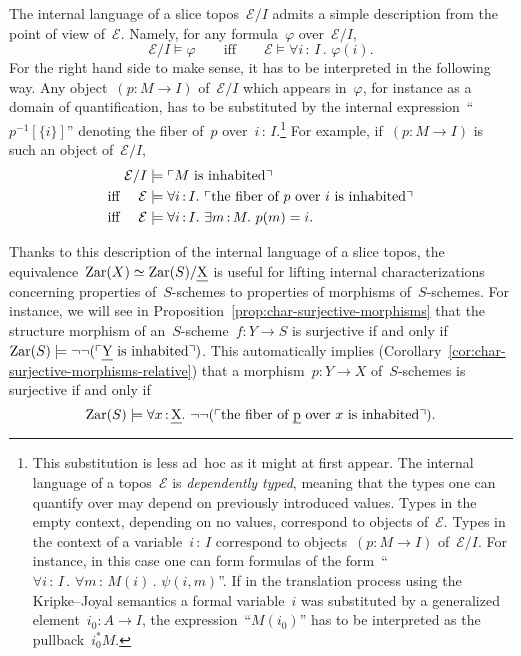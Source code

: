 \documentclass[10pt,reqno,a4paper]{amsbook}
\theoremstyle{definition}
\theoremstyle{plain}
\theoremstyle{remark}
\newcommand{\E}{\mathcal{E}}
\let\oldul\ul
\renewcommand{\ul}[1]{\text{\oldul{$#1$}}}
\newcommand{\Zar}{\mathrm{Zar}}
\newcommand{\?}{\,{:}\,}
\renewcommand{\_}{\mathpunct{.}\,}
\newcommand{\speak}[1]{\ulcorner\text{\textnormal{#1}}\urcorner}
\begin{document}
The internal language of a slice topos~$\E/I$ admits a
simple description from the point of view of~$\E$. Namely, for
any formula~$\varphi$ over~$\E/I$,
\[ \E/I \models \varphi \qquad\text{iff}\qquad
  \E \models \forall i\?I\_ \varphi(i). \]
For the right hand side to make sense, it has to be interpreted in the
following way. Any object~$(p : M \to I)$ of~$\E/I$ which appears in~$\varphi$,
for instance as a domain of quantification, has to be substituted by the
internal expression~``$p^{-1}[\{i\}]$'' denoting the fiber of~$p$
over~$i\?I$.\footnote{This substitution is less ad~hoc as it might at first
appear. The internal language of a topos~$\E$ is \emph{dependently typed}, meaning
that the types one can quantify over may depend on previously introduced
values. Types in the empty context, depending on no values, correspond to
objects of~$\E$. Types in the context of a variable~$i\?I$ correspond to
objects~$(p : M \to I)$ of~$\E/I$. For instance, in this case one can form
formulas of the form~``$\forall i\?I\_ \forall m\?M(i)\_ \psi(i,m)$''. If in
the translation process using the Kripke--Joyal semantics a formal variable~$i$
was substituted by a generalized element~$i_0 : A \to I$, the
expression~``$M(i_0)$'' has to be interpreted as the pullback~$i_0^* M$.}
For example, if~$(p : M \to I)$ is such an object of~$\E/I$,
\begin{align*}
  &\phantom{\text{iff }} \E/I \models \speak{$M$ is inhabited} \\
  &\text{iff } \phantom{/I}\E \models \forall i\?I\_ \speak{the fiber of $p$ over $i$ is inhabited} \\
  &\text{iff } \phantom{/I}\E \models \forall i\?I\_ \exists m\?M\_ p(m) = i.
\end{align*}

Thanks to this description of the internal language of a slice topos, the
equivalence~$\Zar(X) \simeq \Zar(S)/\ul{X}$ is useful for lifting internal
characterizations concerning properties of~$S$-schemes to properties of
morphisms of~$S$-schemes. For instance, we will see in
Proposition~\ref{prop:char-surjective-morphisms} that the structure morphism of
an~$S$-scheme~$f : Y \to S$ is surjective if and only if
$\Zar(S) \models \neg\neg(\speak{$\ul{Y}$ is inhabited})$.
This automatically implies (Corollary~\ref{cor:char-surjective-morphisms-relative})
that a morphism~$p : Y \to X$ of~$S$-schemes is surjective if and only if
\[ \Zar(S) \models \forall x\?\ul{X}\_ \neg\neg(\speak{the fiber of~$\ul{p}$
over~$x$ is inhabited}). \]
\end{document}
